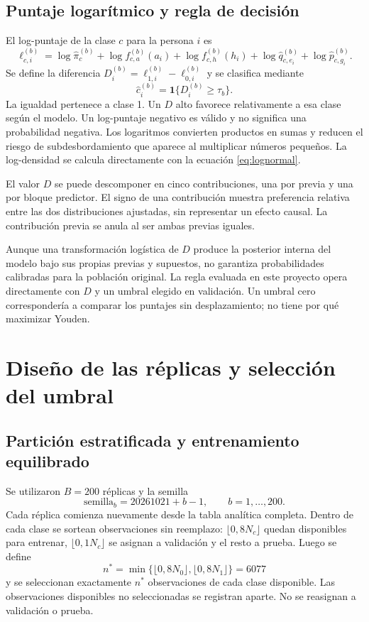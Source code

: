 \documentclass[11pt,a4paper]{article}
\begin{document}
\subsection{Puntaje logarítmico y regla de decisión}
El log-puntaje de la clase $c$ para la persona $i$ es
\begin{equation}\label{eq:puntaje}
\ell_{c,i}^{(b)}=\log\widehat\pi_c^{(b)}+\log f_{c,a}^{(b)}(a_i)+\log f_{c,h}^{(b)}(h_i)+\log\widehat q_{c,e_i}^{(b)}+\log\widehat p_{c,g_i}^{(b)}.
\end{equation}
Se define la diferencia $D_i^{(b)}=\ell_{1,i}^{(b)}-\ell_{0,i}^{(b)}$ y se clasifica mediante
\begin{equation}\label{eq:decision}
\widehat c_i^{(b)}=\mathbf 1\{D_i^{(b)}\geq\tau_b\}.
\end{equation}
La igualdad pertenece a clase 1. Un $D$ alto favorece relativamente a esa clase según el modelo. Un log-puntaje negativo es válido y no significa una probabilidad negativa. Los logaritmos convierten productos en sumas y reducen el riesgo de subdesbordamiento que aparece al multiplicar números pequeños. La log-densidad se calcula directamente con la ecuación \eqref{eq:lognormal}.

El valor $D$ se puede descomponer en cinco contribuciones, una por previa y una por bloque predictor. El signo de una contribución muestra preferencia relativa entre las dos distribuciones ajustadas, sin representar un efecto causal. La contribución previa se anula al ser ambas previas iguales.

Aunque una transformación logística de $D$ produce la posterior interna del modelo bajo sus propias previas y supuestos, no garantiza probabilidades calibradas para la población original. La regla evaluada en este proyecto opera directamente con $D$ y un umbral elegido en validación. Un umbral cero correspondería a comparar los puntajes sin desplazamiento; no tiene por qué maximizar Youden.

\section{Diseño de las réplicas y selección del umbral}
\subsection{Partición estratificada y entrenamiento equilibrado}
Se utilizaron $B=200$ réplicas y la semilla
\begin{equation}
\mathrm{semilla}_b=20261021+b-1,\qquad b=1,\ldots,200.
\end{equation}
Cada réplica comienza nuevamente desde la tabla analítica completa. Dentro de cada clase se sortean observaciones sin reemplazo: $\lfloor0,8N_c\rfloor$ quedan disponibles para entrenar, $\lfloor0,1N_c\rfloor$ se asignan a validación y el resto a prueba. Luego se define
\begin{equation}
n^*=\min\{\lfloor0,8N_0\rfloor,\lfloor0,8N_1\rfloor\}=6077
\end{equation}
y se seleccionan exactamente $n^*$ observaciones de cada clase disponible. Las observaciones disponibles no seleccionadas se registran aparte. No se reasignan a validación o prueba.
\end{document}
